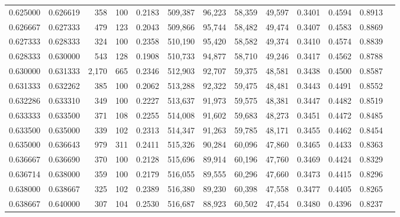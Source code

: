 \begin{tabular}{rrrrrrrrrrrrr}
0.625000 & 0.626619 &   358 & 100 &                                     0.2183 & 509,387 &  96,223 &  58,359 &  49,597 & 0.3401 & 0.4594 & 0.8913 \\
0.626667 & 0.627333 &   479 & 123 &                                     0.2043 & 509,866 &  95,744 &  58,482 &  49,474 & 0.3407 & 0.4583 & 0.8869 \\
0.627333 & 0.628333 &   324 & 100 &                                     0.2358 & 510,190 &  95,420 &  58,582 &  49,374 & 0.3410 & 0.4574 & 0.8839 \\
0.628333 & 0.630000 &   543 & 128 &                                     0.1908 & 510,733 &  94,877 &  58,710 &  49,246 & 0.3417 & 0.4562 & 0.8788 \\
0.630000 & 0.631333 & 2,170 & 665 &                                     0.2346 & 512,903 &  92,707 &  59,375 &  48,581 & 0.3438 & 0.4500 & 0.8587 \\
0.631333 & 0.632262 &   385 & 100 &                                     0.2062 & 513,288 &  92,322 &  59,475 &  48,481 & 0.3443 & 0.4491 & 0.8552 \\
0.632286 & 0.633310 &   349 & 100 &                                     0.2227 & 513,637 &  91,973 &  59,575 &  48,381 & 0.3447 & 0.4482 & 0.8519 \\
0.633333 & 0.633500 &   371 & 108 &                                     0.2255 & 514,008 &  91,602 &  59,683 &  48,273 & 0.3451 & 0.4472 & 0.8485 \\
0.633500 & 0.635000 &   339 & 102 &                                     0.2313 & 514,347 &  91,263 &  59,785 &  48,171 & 0.3455 & 0.4462 & 0.8454 \\
0.635000 & 0.636643 &   979 & 311 &                                     0.2411 & 515,326 &  90,284 &  60,096 &  47,860 & 0.3465 & 0.4433 & 0.8363 \\
0.636667 & 0.636690 &   370 & 100 &                                     0.2128 & 515,696 &  89,914 &  60,196 &  47,760 & 0.3469 & 0.4424 & 0.8329 \\
0.636714 & 0.638000 &   359 & 100 &                                     0.2179 & 516,055 &  89,555 &  60,296 &  47,660 & 0.3473 & 0.4415 & 0.8296 \\
0.638000 & 0.638667 &   325 & 102 &                                     0.2389 & 516,380 &  89,230 &  60,398 &  47,558 & 0.3477 & 0.4405 & 0.8265 \\
0.638667 & 0.640000 &   307 & 104 &                                     0.2530 & 516,687 &  88,923 &  60,502 &  47,454 & 0.3480 & 0.4396 & 0.8237 \\

\end{tabular}
